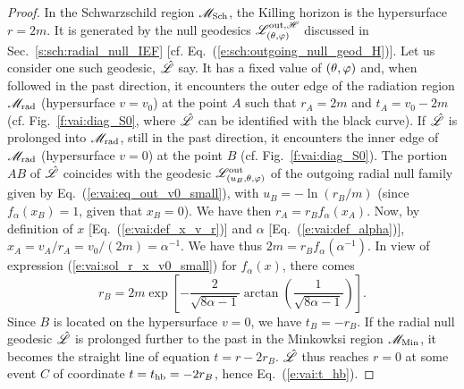 \begin{proof}
In the Schwarzschild region $\mathscr{M}_{\rm Sch}$, the Killing horizon is the hypersurface
$r = 2m$. It is generated by the null geodesics $\mathscr{L}^{{\rm out},\mathscr{H}}_{(\theta,\varphi)}$
discussed in Sec.~\ref{s:sch:radial_null_IEF} [cf. Eq.~(\ref{e:sch:outgoing_null_geod_H})].
Let us consider one such geodesic, $\hat{\mathscr{L}}$ say.
It has a fixed value of $(\theta,\varphi)$ and, when followed in the past direction,
it encounters the outer edge of the radiation region $\mathscr{M}_{\rm rad}$
(hypersurface $v=v_0$) at the point $A$ such that $r_A = 2m$ and $t_A = v_0 - 2m$
(cf. Fig.~\ref{f:vai:diag_S0}, where $\hat{\mathscr{L}}$ can be identified with the
black curve). If $\hat{\mathscr{L}}$ is prolonged into $\mathscr{M}_{\rm rad}$, still in the past direction, it encounters the inner edge of $\mathscr{M}_{\rm rad}$ (hypersurface $v=0$) at the point $B$
(cf. Fig.~\ref{f:vai:diag_S0}).
The portion $AB$ of $\hat{\mathscr{L}}$ coincides with the geodesic $\mathscr{L}_{(u_B,\theta,\varphi)}^{\rm out}$
of the outgoing radial null family given by Eq.~(\ref{e:vai:eq_out_v0_small}),
with $u_B = - \ln(r_B / m)$ (since $f_\alpha(x_B)=1$, given that $x_B = 0$).
We have then $r_A = r_B f_\alpha(x_A)$.
Now, by definition of $x$ [Eq.~(\ref{e:vai:def_x_v_r})] and
$\alpha$ [Eq.~(\ref{e:vai:def_alpha})],
$x_A = v_A / r_A = v_0 / (2m) = \alpha^{-1}$.
We have thus $2 m = r_B f_\alpha(\alpha^{-1})$. In view of expression
(\ref{e:vai:sol_r_x_v0_small}) for $f_\alpha(x)$, there comes
\[
    r_B = 2 m \exp \left[ - \frac{2}{\sqrt{8\alpha - 1}}
    \arctan\left( \frac{1}{\sqrt{8\alpha - 1}} \right) \right] .
\]
Since $B$ is located on the hypersurface $v=0$, we have $t_B = - r_B$.
If the radial null geodesic $\hat{\mathscr{L}}$
is prolonged further to the past in the Minkowksi
region $\mathscr{M}_{\rm Min}$, it becomes the straight line of equation $t = r - 2 r_B$.
$\hat{\mathscr{L}}$ thus reaches $r=0$ at some event $C$ of
coordinate $t = t_{\rm hb} = -2 r_B$, hence Eq.~(\ref{e:vai:t_hb}).


\end{proof}
